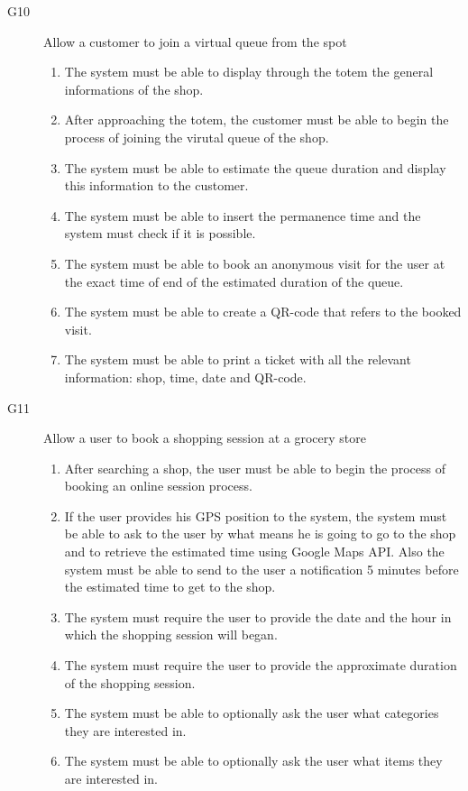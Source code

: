 \begin{description}
    \item [G10] Allow a customer to join a virtual queue from the spot
        \begin{enumerate}[resume*]
            \item The system must be able to display through the totem the general informations of the shop.
            \item After approaching the totem, the customer must be able to begin the process of joining the virutal queue of the shop.
            \item The system must be able to estimate the queue duration and display this information to the customer.
            \item The system must be able to insert the permanence time and the system must check if it is possible.
            \item The system must be able to book an anonymous visit for the user at the exact time of end of the estimated duration of the queue.
            \item The system must be able to create a QR-code that refers to the booked visit.
            \item The system must be able to print a ticket with all the relevant information: shop, time, date and QR-code.
        \end{enumerate}
    \item [G11] Allow a user to book a shopping session at a grocery store
        \begin{enumerate}[resume*]
            \item After searching a shop, the user must be able to begin the process of booking an online session process.
            \item If the user provides his GPS position to the system, the system must be able to ask to the user by what means he is going to go to the shop and to retrieve the estimated time using Google Maps API. Also the system must be able to send to the user a notification 5 minutes before the estimated time to get to the shop.
            \item The system must require the user to provide the date and the hour in which the shopping session will began.
            \item The system must require the user to provide the approximate duration of the shopping session.
            \item The system must be able to optionally ask the user what categories they are interested in.
            \item The system must be able to optionally ask the user what items they are interested in.

\end{enumerate}
\end{description}
